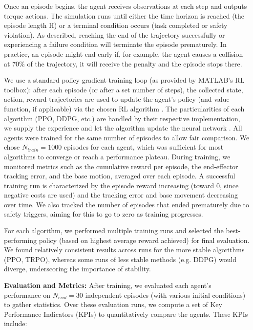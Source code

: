 \documentclass{ieeeaccess}
\begin{document}
Once an episode begins, the agent receives observations at each step and outputs torque actions. The
simulation runs until either the time horizon is reached (the episode length H) or a terminal condition
occurs (task completed or safety violation). As described, reaching the end of the trajectory successfully
or experiencing a failure condition will terminate the episode prematurely. In practice, an episode might end early
if, for example, the agent causes a collision at 70\% of the trajectory, it will receive the penalty and the
episode stops there.

We use a standard policy gradient training loop (as provided by MATLAB’s RL toolbox): after each
episode (or after a set number of steps), the collected state, action, reward trajectories are used to
update the agent’s policy (and value function, if applicable) via the chosen RL algorithm \cite{b4}. The particularities of
each algorithm (PPO, DDPG, etc.) are handled by their respective implementation, we supply the
experience and let the algorithm update the neural network \cite{b7}.
All agents were trained for the same number of episodes to allow fair comparison. We chose
$N_{train} = 1000$ episodes for each agent, which was sufficient for most algorithms to
converge or reach a performance plateau. During training, we monitored metrics such as the
cumulative reward per episode, the end-effector tracking error, and the base motion, averaged over
each episode. A successful training run is characterized by the episode reward increasing (toward 0,
since negative costs are used) and the tracking error and base movement decreasing over time. We
also tracked the number of episodes that ended prematurely due to safety triggers, aiming for this to
go to zero as training progresses.

For each algorithm, we performed multiple training runs and selected the best-performing policy
(based on highest average reward achieved) for final evaluation. We found relatively
consistent results across runs for the more stable algorithms (PPO, TRPO), whereas some runs of less
stable methods (e.g. DDPG) would diverge, underscoring the importance of stability.

\textbf{Evaluation and Metrics:} After training, we evaluated each agent’s performance on $N_{eval}
= 30$ independent episodes (with various initial conditions) to gather statistics. Over these
evaluation runs, we compute a set of Key Performance Indicators (KPIs) to quantitatively compare the
agents. These KPIs include: 
\end{document}
